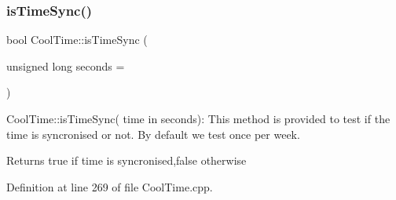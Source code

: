 \mbox{\label{class_cool_time_a5ae038a4498602b189f76a10bf02adf8}} 
\subsubsection{\texorpdfstring{is\+Time\+Sync()}{isTimeSync()}}
{\footnotesize\ttfamily bool Cool\+Time\+::is\+Time\+Sync (\begin{DoxyParamCaption}\item[{unsigned long}]{seconds = {} }\end{DoxyParamCaption})}

Cool\+Time\+::is\+Time\+Sync( time in seconds)\+: This method is provided to test if the time is syncronised or not. By default we test once per week.

\begin{DoxyReturn}{Returns}
true if time is syncronised,false otherwise 
\end{DoxyReturn}


Definition at line 269 of file Cool\+Time.\+cpp.


